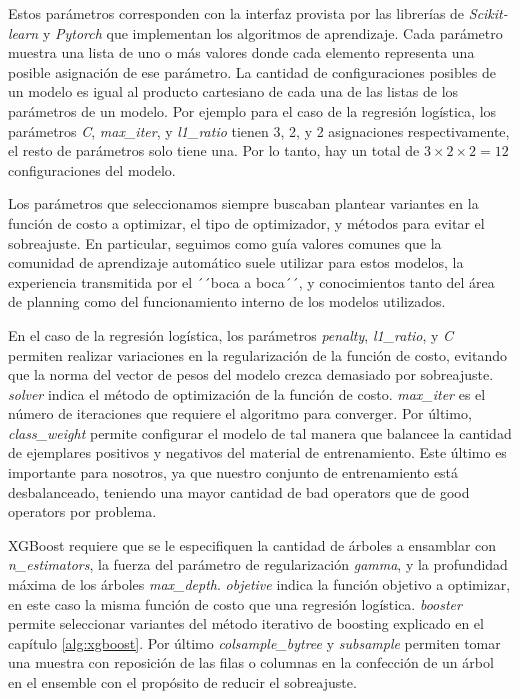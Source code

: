 Estos parámetros corresponden con la interfaz provista por las librerías de
\emph{Scikit-learn} y \emph{Pytorch} que implementan los algoritmos de
aprendizaje. Cada parámetro muestra una lista de uno o más valores donde cada
elemento representa una posible asignación de ese parámetro. La cantidad de
configuraciones posibles de un modelo es igual al producto cartesiano de cada
una de las listas de los parámetros de un modelo. Por ejemplo para el caso de la
regresión logística, los parámetros \emph{C}, \emph{max\_iter}, y
\emph{l1\_ratio} tienen 3, 2, y 2 asignaciones respectivamente, el resto de
parámetros solo tiene una. Por lo tanto, hay un total de $3 \times 2 \times 2 =
12$ configuraciones del modelo.

Los parámetros que seleccionamos siempre buscaban plantear variantes en la
función de costo a optimizar, el tipo de optimizador, y métodos para evitar el
sobreajuste. En particular, seguimos como guía valores comunes que la comunidad
de aprendizaje automático suele utilizar para estos modelos,  la experiencia
transmitida por el ´´boca a boca´´, y conocimientos tanto del área de planning
como del funcionamiento interno de los modelos utilizados. 

En el caso de la regresión logística, los parámetros \emph{penalty},
\emph{l1\_ratio}, y \emph{C} permiten realizar variaciones en la regularización
de la función de costo, evitando que la norma del vector de pesos del modelo
crezca demasiado por sobreajuste. \emph{solver} indica el método de optimización
de la función de costo. \emph{max\_iter} es el número de iteraciones que
requiere el algoritmo para converger. Por último, \emph{class\_weight} permite
configurar el modelo de tal manera que balancee la cantidad de ejemplares
positivos y negativos del material de entrenamiento. Este último es importante
para nosotros, ya que nuestro conjunto de entrenamiento está desbalanceado,
teniendo una mayor cantidad de bad operators que de good operators por problema.

XGBoost requiere que se le especifiquen la cantidad de árboles a ensamblar con
\emph{n\_estimators}, la fuerza del parámetro de regularización \emph{gamma}, y
la profundidad máxima de los árboles \emph{max\_depth}. \emph{objetive} indica
la función objetivo a optimizar, en este caso la misma función de costo que una
regresión logística. \emph{booster} permite seleccionar variantes del método
iterativo de boosting explicado en el capítulo \ref{alg:xgboost}. Por último
\emph{colsample\_bytree} y \emph{subsample} permiten tomar una muestra con
reposición de las filas o columnas en la confección de un árbol en el ensemble
con el propósito de reducir el sobreajuste.

